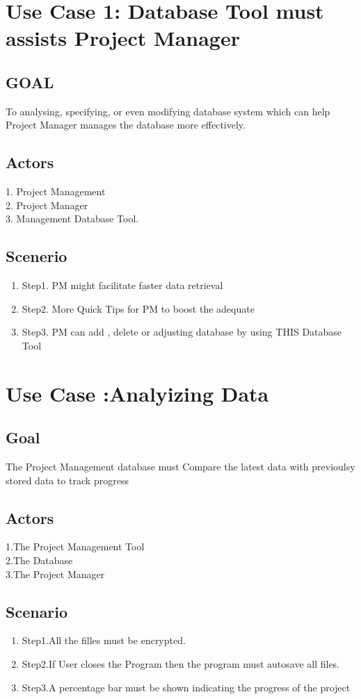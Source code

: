 \documentclass[10pt]{article}
\begin{document}
\section*{Use Case 1: Database Tool must assists Project Manager }
\subsection{GOAL}
To analysing, specifying, or even modifying database system which can help Project Manager manages the database more effectively.
\subsection{Actors}
1. Project Management \\
2. Project Manager \\
3. Management Database Tool. 
\subsection{Scenerio}
\begin{enumerate}
\item Step1. PM might facilitate faster data retrieval 
\item Step2. More Quick Tips for PM to boost the adequate 
\item Step3. PM can add , delete or adjusting database by using THIS Database Tool
\end{enumerate}

\section * {Use Case :Analyizing Data}
\subsection * {Goal}
The Project Management database must Compare the latest data with previoulsy stored data to track progress
\subsection * {Actors}
1.The Project Management Tool\\
2.The Database\\
3.The Project Manager

\subsection * {Scenario}
\begin{enumerate}
\item Step1.All the filles must be encrypted.
\item Step2.If User closes the Program then the program must autosave all files.
\item Step3.A percentage bar must be shown indicating the progress of the project
\end{enumerate}
\end{document}
